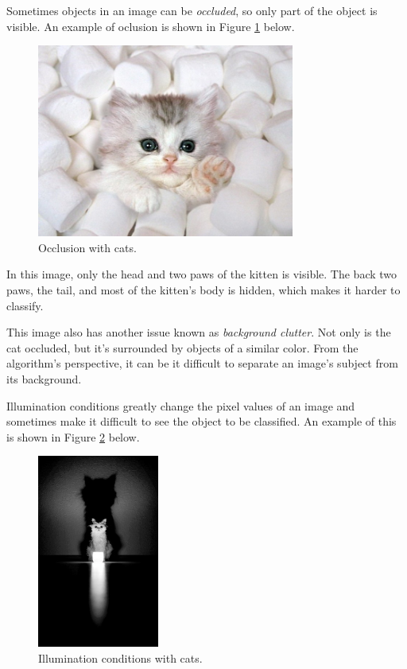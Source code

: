 \noindent Sometimes objects in an image can be \textit{occluded}, so only part
of the object is visible. An example of oclusion is shown in Figure
\ref{fig:occlusion} below.

\begin{figure}[ht!] \centering
\includegraphics[height=2.5in]{../figures/kitty_occlusion.jpg}
\caption{Occlusion with cats.} \label{fig:occlusion} \end{figure}

\noindent In this image, only the head and two paws of the kitten is visible.
The back two paws, the tail, and most of the kitten's body is hidden, which
makes it harder to classify.

\noindent This image also has another issue known as \textit{background
clutter}. Not only is the cat occluded, but it's surrounded by objects of a
similar color.  From the algorithm's perspective, it can be it difficult to
separate an image's subject from its background.

\noindent Illumination conditions greatly change the pixel values of an image
and sometimes make it difficult to see the object to be classified. An example
of this is shown in Figure \ref{fig:illumination} below.

\begin{figure}[ht!] \centering
\includegraphics[height=2.5in]{../figures/kitty_illumination.jpg}
\caption{Illumination conditions with cats.} \label{fig:illumination}
\end{figure}

